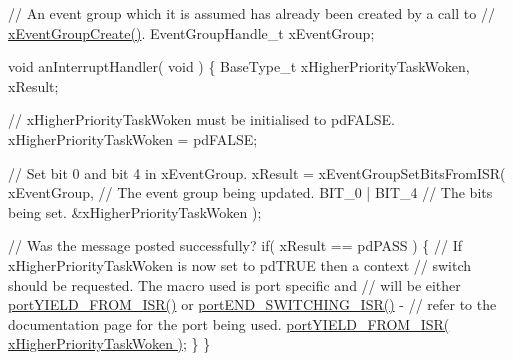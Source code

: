 \begin{DoxyPre}  // An event group which it is assumed has already been created by a call to
  // \hyperlink{vendor_2ceedling_2plugins_2freertos_2src_2freertos_2include_2event__groups_8h_a7ed741a0902718aca9c8d3ca273f1b73}{xEventGroupCreate()}.
  EventGroupHandle\_t xEventGroup;\end{DoxyPre}



\begin{DoxyPre}  void anInterruptHandler( void )
  \{
  BaseType\_t xHigherPriorityTaskWoken, xResult;\end{DoxyPre}



\begin{DoxyPre}    // xHigherPriorityTaskWoken must be initialised to pdFALSE.
    xHigherPriorityTaskWoken = pdFALSE;\end{DoxyPre}



\begin{DoxyPre}    // Set bit 0 and bit 4 in xEventGroup.
    xResult = xEventGroupSetBitsFromISR(
                        xEventGroup,    // The event group being updated.
                        BIT\_0 | BIT\_4   // The bits being set.
                        \&xHigherPriorityTaskWoken );\end{DoxyPre}



\begin{DoxyPre}    // Was the message posted successfully?
    if( xResult == pdPASS )
    \{
        // If xHigherPriorityTaskWoken is now set to pdTRUE then a context
        // switch should be requested.  The macro used is port specific and 
        // will be either \hyperlink{externals_2freertos_2portable_2_g_c_c_2_a_r_m___c_m0_2portmacro_8h_aac6850c66595efdc02a8bbb95fb4648e}{portYIELD\_FROM\_ISR()} or \hyperlink{externals_2freertos_2portable_2_g_c_c_2_a_r_m___c_m0_2portmacro_8h_a63b994040c62c9685490a71c87a13d8a}{portEND\_SWITCHING\_ISR()} - 
        // refer to the documentation page for the port being used.
        \hyperlink{vendor_2ceedling_2plugins_2freertos_2vendor_2freertos_2portable_2_g_c_c_2_p_o_s_i_x_2portmacro_8h_aac6850c66595efdc02a8bbb95fb4648e}{portYIELD\_FROM\_ISR( xHigherPriorityTaskWoken )};
    \}
 \}
  \end{DoxyPre}
 